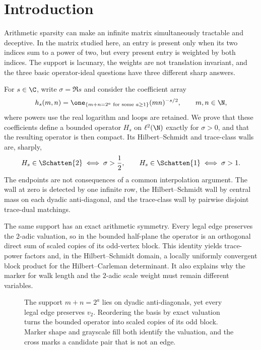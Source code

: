 \section{Introduction}
\label{sec:introduction}

Arithmetic sparsity can make an infinite matrix simultaneously tractable and
deceptive.  In the matrix studied here, an entry is present only when its two
indices sum to a power of two, but every present entry is weighted by both
indices.  The support is lacunary, the weights are not translation invariant,
and the three basic operator-ideal questions have three different sharp
answers.

For $s\in\C$, write $\sigma=\Re s$ and consider the coefficient array
\begin{equation}
  h_s(m,n)=\one_{\{m+n=2^a\text{ for some }a\ge1\}}
  (mn)^{-s/2},\qquad m,n\in\N,
  \label{eq:intro-matrix}
\end{equation}
where powers use the real logarithm and loops are retained.  We prove that
these coefficients define a bounded operator $H_s$ on $\ell^2(\N)$ exactly
for $\sigma>0$, and that the resulting operator is then compact.  Its
Hilbert--Schmidt and trace-class walls are, sharply,
\begin{equation}
  H_s\in\Schatten{2}\iff\sigma>\frac12,
  \qquad
  H_s\in\Schatten{1}\iff\sigma>1.
  \label{eq:intro-walls}
\end{equation}
The endpoints are not consequences of a common interpolation argument.  The
wall at zero is detected by one infinite row, the Hilbert--Schmidt wall by
central mass on each dyadic anti-diagonal, and the trace-class wall by
pairwise disjoint trace-dual matchings.

The same support has an exact arithmetic symmetry.  Every legal edge
preserves the $2$-adic valuation, so in the bounded half-plane the operator
is an orthogonal direct sum of scaled copies of its odd-vertex block.  This
identity yields trace-power factors and, in the Hilbert--Schmidt domain, a
locally uniformly convergent block product for the Hilbert--Carleman
determinant.  It also explains why the marker for walk length and the
$2$-adic scale weight must remain different variables.

\begin{figure}[t]
  \centering
  \resizebox{\textwidth}{!}{}
  \caption{The support $m+n=2^a$ lies on dyadic anti-diagonals, yet every
  legal edge preserves $v_2$.  Reordering the basis by exact valuation turns
  the bounded operator into scaled copies of its odd block.  Marker shape and
  grayscale fill both identify the valuation, and the cross marks a
  candidate pair that is not an edge.}
  \label{fig:dyadic-blocks-main}
\end{figure}

